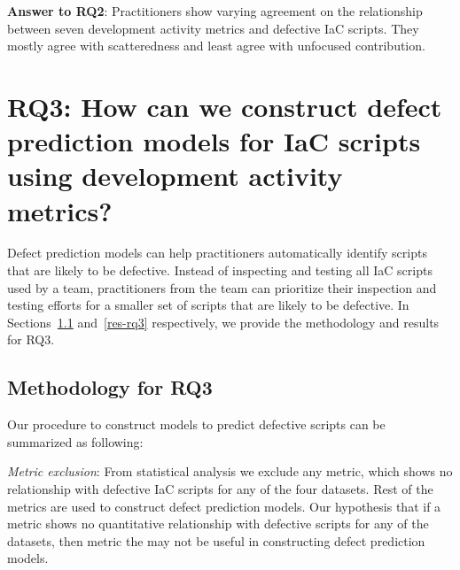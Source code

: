 \documentclass[smallextended]{svjour3}       %
\begin{document}

\begin{mdframed}
\textbf{Answer to RQ2}: Practitioners show varying agreement on the relationship between seven development activity metrics and defective IaC scripts. They mostly agree with scatteredness and least agree with unfocused contribution.       
\end{mdframed}



\section{RQ3: How can we construct defect prediction models for IaC scripts using development activity metrics?}
\label{rq3} 

Defect prediction models can help practitioners automatically identify scripts that are likely to be defective. Instead of inspecting and testing all IaC scripts used by a team, practitioners from the team can prioritize their inspection and testing efforts for a smaller set of scripts that are likely to be defective. In Sections~\ref{meth-rq3} and~\ref{res-rq3} respectively, we provide the methodology and results for RQ3. 


\subsection{Methodology for RQ3} 
\label{meth-rq3} 

Our procedure to construct models to predict defective scripts can be summarized as following: 

\textit{Metric exclusion}: From statistical analysis we exclude any metric, which shows no relationship with defective IaC scripts for any of the four datasets. Rest of the metrics are used to construct defect prediction models. Our hypothesis that if a metric shows no quantitative relationship with defective scripts for any of the datasets, then metric the may not be useful in constructing defect prediction models. 
\end{document}
